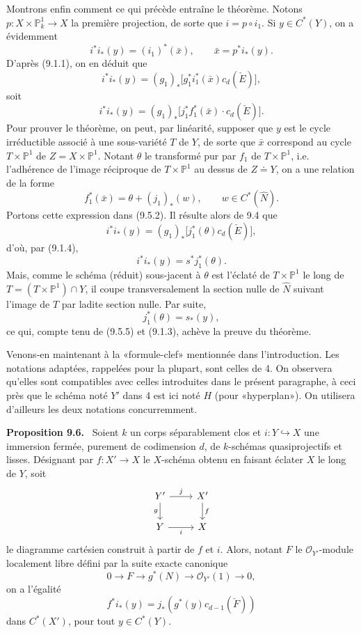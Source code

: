 \documentclass[11pt]{article}
\newenvironment{statement}[1]{\par\medskip\noindent\textbf{#1.}\ }{\par\medskip}
\begin{document}
Montrons enfin comment ce qui précède entraîne le théorème. Notons $p:X\times\mathbb P^1_k\to X$ la première projection, de sorte que $i=p\circ i_1$. Si $y\in C^*(Y)$, on a évidemment
\[
i^*i_*(y)=(i_1)^*(\bar x),\qquad \bar x=p^*i_*(y).
\tag{9.5.1}
\]
D'après (9.1.1), on en déduit que
\[
i^*i_*(y)=(g_1)_*\bigl[g_1^*i_1^*(\bar x)c_d(\check E)\bigr],
\]
soit
\[
i^*i_*(y)=(g_1)_*\bigl[j_1^*f_1^*(\bar x)\cdot c_d(\check E)\bigr].
\tag{9.5.2}
\]
Pour prouver le théorème, on peut, par linéarité, supposer que $y$ est le cycle irréductible associé à une sous-variété $T$ de $Y$, de sorte que $\bar x$ correspond au cycle $T\times\mathbb P^1$ de $Z=X\times\mathbb P^1$. Notant $\theta$ le transformé pur par $f_1$ de $T\times\mathbb P^1$, i.e. l'adhérence de l'image réciproque de $T\times\mathbb P^1$ au dessus de $Z\doteq Y$, on a une relation de la forme
\[
f_1^*(\bar x)=\theta+(j_1)_*(w),\qquad w\in C^*(\widehat N).
\tag{9.5.3}
\]
Portons cette expression dans (9.5.2). Il résulte alors de 9.4 que
\[
i^*i_*(y)=(g_1)_*\bigl[j_1^*(\theta)c_d(\check E)\bigr],
\tag{9.5.4}
\]
d'où, par (9.1.4),
\[
i^*i_*(y)=s^*j_1^*(\theta).
\tag{9.5.5}
\]
Mais, comme le schéma (réduit) sous-jacent à $\theta$ est l'éclaté de $T\times\mathbb P^1$ le long de $T=(T\times\mathbb P^1)\cap Y$, il coupe transversalement la section nulle de $\widehat N$ suivant l'image de $T$ par ladite section nulle. Par suite,
\[
j_1^*(\theta)=s_*(y),
\]
ce qui, compte tenu de (9.5.5) et (9.1.3), achève la preuve du théorème.

Venons-en maintenant à la «formule-clef» mentionnée dans l'introduction. Les notations adaptées, rappelées pour la plupart, sont celles de 4. On observera qu'elles sont compatibles avec celles introduites dans le présent paragraphe, à ceci près que le schéma noté $Y'$ dans 4 est ici noté $H$ (pour «hyperplan»). On utilisera d'ailleurs les deux notations concurremment.

\begin{statement}{Proposition 9.6}
Soient $k$ un corps séparablement clos et $i:Y\hookrightarrow X$ une immersion fermée, purement de codimension $d$, de $k$-schémas quasiprojectifs et lisses. Désignant par $f:X'\to X$ le $X$-schéma obtenu en faisant éclater $X$ le long de $Y$, soit
\[
\begin{tikzcd}
Y'\arrow[r,"j"]\arrow[d,"g"']&X'\arrow[d,"f"]\\
Y\arrow[r,"i"']&X
\end{tikzcd}
\]
le diagramme cartésien construit à partir de $f$ et $i$. Alors, notant $F$ le $\mathcal O_{Y'}$-module localement libre défini par la suite exacte canonique
\[
0\to F\to g^*(N)\to\mathcal O_{Y'}(1)\to0,
\tag{9.6.1}
\]
on a l'égalité
\[
f^*i_*(y)=j_*(g^*(y)c_{d-1}(\check F))
\tag{9.6.2}
\]
dans $C^*(X')$, pour tout $y\in C^*(Y)$.
\end{statement}
\end{document}
